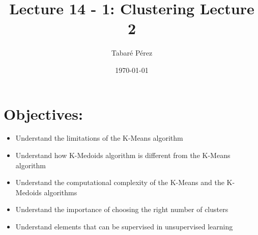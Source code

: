 \documentclass[a4paper, 12pt]{article}
\author{Tabaré Pérez}
\date{\today}
\title{Lecture 14 - 1: Clustering Lecture 2}
\begin{document}
\maketitle
\section*{Objectives:}
\label{sec:org51bc25b}
\begin{itemize}
\item Understand the limitations of the K-Means algorithm
\item Understand how K-Medoids algorithm is different from the K-Means algorithm
\item Understand the computational complexity of the K-Means and the K-Medoids
algorithms
\item Understand the importance of choosing the right number of clusters
\item Understand elements that can be supervised in unsupervised learning
\end{itemize}
\end{document}
